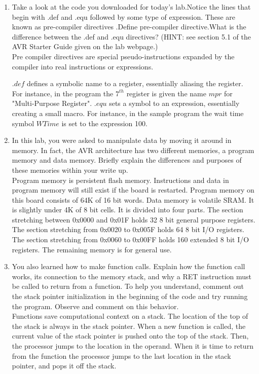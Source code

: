 \documentclass[12pt,letterpaper]{article}
\begin{document}
\begin{enumerate}

\item Take a look at the code you downloaded for today’s lab.Notice the lines
that begin with .def and .equ followed by some type of expression. These are
known as pre-compiler directives .Define pre-compiler directive.What is the
difference between the .def and .equ directives? (HINT: see section 5.1 of the
AVR Starter Guide given on the lab webpage.)\\
    Pre compiler directives are special pseudo-instructions expanded by the
    compiler into real instructions or expressions.

    $.def$ defines a symbolic name to a register, essentially aliasing
    the register. For instance, in the program the $7^{th}$ register is given
    the name $mpr$ for "Multi-Purpose Register".
    $.equ$ sets a symbol to an expression, essentially creating a small
    macro. For instance, in the sample program the wait time symbol $WTime$ is
    set to the expression 100.



\item In this lab, you were asked to manipulate data by moving it around in
memory. In fact, the AVR architecture has two different memories, a program
memory and data memory. Briefly explain the differences and purposes of these
memories within your write up. \\

    Program memory is persistent flash memory. Instructions and data in program memory will still exist if the board is restarted. Program memory on this board consists of 64K of 16 bit words. Data memory is volatile SRAM. It is slightly under 4K of 8 bit cells. It is divided into four parts. The section stretching between 0x0000 and 0x01F holds 32 8 bit general purpose registers. The section stretching from 0x0020 to 0x005F holds 64 8 bit I/O registers. The section stretching from 0x0060 to 0x00FF holds 160 extended 8 bit I/O registers. The remaining memory is for general use.

\item You also learned how to make function calls. Explain how the function
call works, its connection to the memory stack, and why a RET instruction must
be called to return from a function. To help you understand, comment out the
stack pointer initialization in the beginning of the code and try running the
program. Observe and comment on this behavior.\\
    Functions save computational context on a stack. The location of the top of the stack is always in the stack pointer. When a new function is called, the current value of the stack pointer is pushed onto the top of the stack. Then, the processor jumps to the location in the operand. When it is time to return from the function the processor jumps to the last location in the stack pointer, and pops it off the stack.


\end{enumerate}
\end{document}
